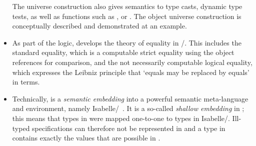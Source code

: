 \begin{itemize}
         The universe construction also gives semantics to type casts, dynamic type
         tests, as well as functions such as ,
         or . The object universe construction is
         conceptually described and demonstrated at an example.
 \item As part of the \OCL logic,  \FOCL develops the theory of
         equality in \UML/\OCL. This includes the standard equality, which is a
         computable strict equality using the object references for comparison,
         and the not necessarily computable logical equality, which expresses
         the Leibniz principle that `equals may be replaced by equals' in
         \OCL terms. 
 \item Technically,  \FOCL is a \emph{semantic embedding} into a
         powerful semantic meta-language and
         environment, namely Isabelle/\HOL~\cite{nipkow.ea:isabelle:2002}.
         It is a so-called \emph{shallow embedding} in \HOL; this means that types
         in \OCL were mapped one-to-one to types in Isabelle/\HOL.
         Ill-typed \OCL specifications can therefore not be represented in
          \FOCL and a type in  \FOCL contains exactly
         the values that are possible in \OCL\@.
\end{itemize}

